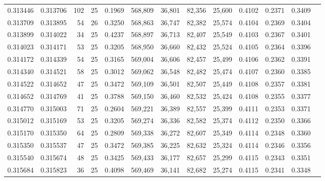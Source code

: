 \begin{tabular}{rrrrrrrrrrrrr}
0.313446 & 0.313706 &   102 &  25 &                                     0.1969 & 568,809 &  36,801 &  82,356 &  25,600 & 0.4102 & 0.2371 & 0.3409 \\
0.313709 & 0.313895 &    54 &  26 &                                     0.3250 & 568,863 &  36,747 &  82,382 &  25,574 & 0.4104 & 0.2369 & 0.3404 \\
0.313899 & 0.314022 &    34 &  25 &                                     0.4237 & 568,897 &  36,713 &  82,407 &  25,549 & 0.4103 & 0.2367 & 0.3401 \\
0.314023 & 0.314171 &    53 &  25 &                                     0.3205 & 568,950 &  36,660 &  82,432 &  25,524 & 0.4105 & 0.2364 & 0.3396 \\
0.314172 & 0.314339 &    54 &  25 &                                     0.3165 & 569,004 &  36,606 &  82,457 &  25,499 & 0.4106 & 0.2362 & 0.3391 \\
0.314340 & 0.314521 &    58 &  25 &                                     0.3012 & 569,062 &  36,548 &  82,482 &  25,474 & 0.4107 & 0.2360 & 0.3385 \\
0.314522 & 0.314652 &    47 &  25 &                                     0.3472 & 569,109 &  36,501 &  82,507 &  25,449 & 0.4108 & 0.2357 & 0.3381 \\
0.314652 & 0.314769 &    41 &  25 &                                     0.3788 & 569,150 &  36,460 &  82,532 &  25,424 & 0.4108 & 0.2355 & 0.3377 \\
0.314770 & 0.315003 &    71 &  25 &                                     0.2604 & 569,221 &  36,389 &  82,557 &  25,399 & 0.4111 & 0.2353 & 0.3371 \\
0.315012 & 0.315169 &    53 &  25 &                                     0.3205 & 569,274 &  36,336 &  82,582 &  25,374 & 0.4112 & 0.2350 & 0.3366 \\
0.315170 & 0.315350 &    64 &  25 &                                     0.2809 & 569,338 &  36,272 &  82,607 &  25,349 & 0.4114 & 0.2348 & 0.3360 \\
0.315350 & 0.315537 &    47 &  25 &                                     0.3472 & 569,385 &  36,225 &  82,632 &  25,324 & 0.4114 & 0.2346 & 0.3356 \\
0.315540 & 0.315674 &    48 &  25 &                                     0.3425 & 569,433 &  36,177 &  82,657 &  25,299 & 0.4115 & 0.2343 & 0.3351 \\
0.315684 & 0.315823 &    36 &  25 &                                     0.4098 & 569,469 &  36,141 &  82,682 &  25,274 & 0.4115 & 0.2341 & 0.3348 \\

\end{tabular}
